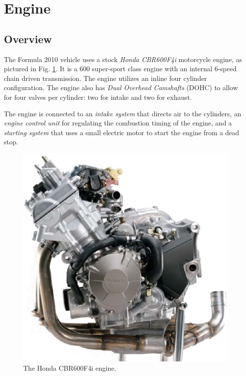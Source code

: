 \section{Engine}

\subsection{Overview}


The Formula 2010 vehicle uses a stock \emph{Honda CBR600F4i} motorcycle engine, as pictured in Fig. \ref{fig:cbr600f4i_engine}. It is a \unit{600}{\centi\cubic\metre} super-sport class engine with an internal 6-speed chain driven transmission. The engine utilizes an inline four cylinder configuration. The engine also has \emph{Dual Overhead Camshafts} (DOHC) to allow for four valves per cylinder: two for intake and two for exhaust.

The engine is connected to an \emph{intake system} that directs air to the cylinders, an \emph{engine control unit} for regulating the combustion timing of the engine, and a \emph{starting system} that uses a small electric motor to start the engine from a dead stop. 

\begin{figure}[H]
	\centering
	 	\includegraphics[scale=0.5]{background/figures/cbr600f4i_engine.eps}
    \caption{The Honda CBR600F4i engine.}
    \label{fig:cbr600f4i_engine}
\end{figure}

